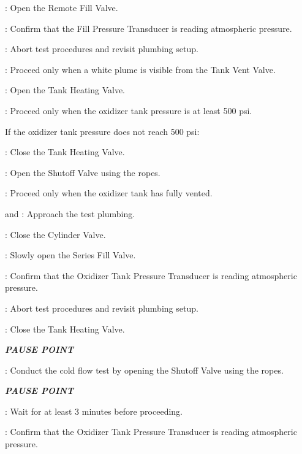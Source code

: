\begin{checklist}
\begin{checklist}[label=$\bullet$]
\begin{checklist}
            \item \primary{}: Open the Remote Fill Valve.
            \item \daq{}: Confirm that the Fill Pressure Transducer is reading atmospheric pressure.
            \item \ops{}: Abort test procedures and revisit plumbing setup.
        \end{checklist}
    \end{checklist}
    \item \secondary{}: Proceed only when a white plume is visible from the Tank Vent Valve.
    \item \heat: Open the Tank Heating Valve.
    \item \daq{}: Proceed only when the oxidizer tank pressure is at least 500 psi.
    \begin{checklist}[label=$\bullet$]
        \item If the oxidizer tank pressure does not reach 500 psi:
        \begin{checklist}
            \item \heat: Close the Tank Heating Valve.
            \item \primary{}: Open the Shutoff Valve using the ropes.
            \item \secondary: Proceed only when the oxidizer tank has fully vented.
            \item \primary{} and \secondary: Approach the test plumbing.
            \item \primary{}: Close the Cylinder Valve.
            \item \primary{}: Slowly open the Series Fill Valve.
            \item \daq{}: Confirm that the Oxidizer Tank Pressure Transducer is reading atmospheric pressure.
            \item \ops{}: Abort test procedures and revisit plumbing setup.
        \end{checklist}
    \end{checklist}
    \item \heat: Close the Tank Heating Valve.
    \item \textbf{\textit{PAUSE POINT}}
    \item \primary{}: Conduct the cold flow test by opening the Shutoff Valve using the ropes.
    \item \textbf{\textit{PAUSE POINT}}
    \item \ops{}: Wait for at least 3 minutes before proceeding.
    \item \daq{}: Confirm that the Oxidizer Tank Pressure Transducer is reading atmospheric pressure.

\end{checklist}
